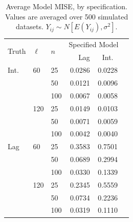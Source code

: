 \documentclass[10pt]{article}
\begin{document}
\begin{table}
\centering
\caption{Average Model MISE, by specification. Values are averaged over 500 simulated datasets. $Y_{ij}\sim N[E(Y_{ij}), \sigma^2]$.\\ \label{t:mise}}
\begin{tabular}{lllrcc}
  \hline
  \hline
\multirow{2}{*}{Truth} & \multirow{2}{*}{$\ell$} & \multirow{2}{*}{$n$}  & \multicolumn{2}{c}{Specified Model}  \\
\cline{4-5}
  &  &  & Lag & Int.  \\ 
  \hline
  Int. & 60 & 25 & 0.0286 & 0.0228 \\  
  &  & 50 & 0.0121 & 0.0096 \\
  &  & 100 & 0.0067 & 0.0058 \\
   \cline{3-5}
  & 120 & 25 & 0.0149 & 0.0103 \\
  &  & 50  & 0.0071 & 0.0059 \\ 
  &  & 100 & 0.0042 & 0.0040 \\ 
   \cline{2-5}
 Lag & 60 & 25 & 0.3583 &  0.7501 \\  
  &  & 50 & 0.0689 & 0.2994 \\
  &  & 100 & 0.0330 & 0.1339 \\
   \cline{3-5}
  & 120 & 25 & 0.2345 & 0.5559 \\
  &  & 50  & 0.0734 & 0.2236 \\ 
  &  & 100 & 0.0319 & 0.1110 \\ 
   \hline
  \hline
\end{tabular}
\end{table}
\end{document}
